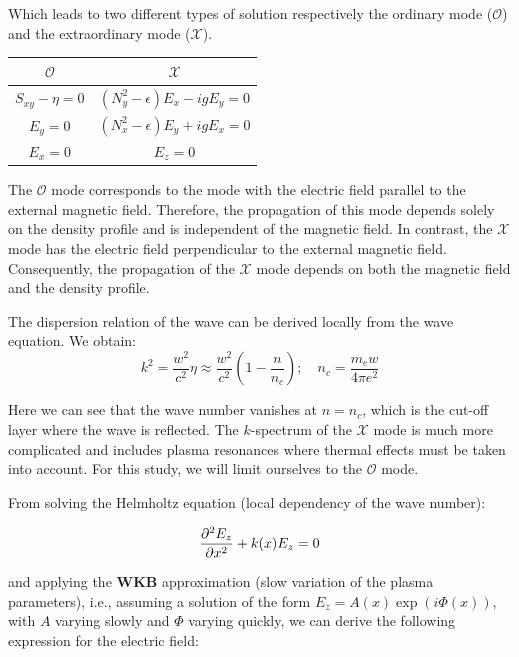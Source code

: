 \documentclass[11pt,a4paper,openany]{report}
\begin{document}
\begin{multicols}{2}
    Which leads to two different types of solution respectively the ordinary mode ($\mathcal{O}$) and the extraordinary mode ($\mathcal{X}$).
    \setlength{\tabcolsep}{18pt}
    \renewcommand{\arraystretch}{1.5}
    \begin{center}
        \begin{tabular}{|| c  | c||}
            \hline
            $\mathcal{O}$       & $\mathcal{X}$                       \\
            \hline\hline
            $S_{xy} - \eta = 0$ & $(N_y^2 - \epsilon)E_x - igE_y = 0$ \\
            $E_y = 0$           & $(N_x^2 - \epsilon)E_y + igE_x = 0$ \\
            $E_x = 0$           & $E_z = 0$                           \\
            \hline
        \end{tabular}
    \end{center}

    The $\mathcal{O}$ mode corresponds to the mode with the electric field parallel to the external magnetic field. Therefore, the propagation of this mode depends solely on the density profile and is independent of the magnetic field. In contrast, the $\mathcal{X}$ mode has the electric field perpendicular to the external magnetic field. Consequently, the propagation of the $\mathcal{X}$ mode depends on both the magnetic field and the density profile.

    The dispersion relation of the wave can be derived locally from the wave equation. We obtain:
    \begin{equation}
        k^2 = \frac{w^2}{c^2} \eta \approx \frac{w^2}{c^2}\left(1 - \frac{n}{n_c}\right); \quad n_c = \frac{m_ew}{4 \pi e^2}
        \label{eq:Dispersion_relation}
    \end{equation}

    Here we can see that the wave number vanishes at \( n = n_c \), which is the cut-off layer where the wave is reflected. The \( k \)-spectrum of the $\mathcal{X}$ mode is much more complicated and includes plasma resonances where thermal effects must be taken into account. For this study, we will limit ourselves to the $\mathcal{O}$ mode.

    From solving the Helmholtz equation (local dependency of the wave number):

    $$
        \pdv[2]{E_z}{x} + k(x)E_z = 0
    $$

    and applying the \textbf{WKB} approximation (slow variation of the plasma parameters), i.e., assuming a solution of the form \( E_z = A(x) \exp(i\Phi(x)) \), with \( A \) varying slowly and \( \Phi \) varying quickly, we can derive the following expression for the electric field:


\end{multicols}
\end{document}
